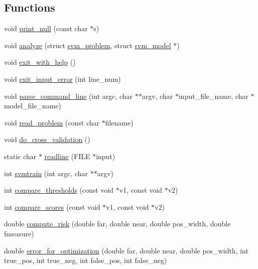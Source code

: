 \subsection*{Functions}
\begin{DoxyCompactItemize}
\item 
void \hyperlink{_2svm-train_8cpp_a65c4fd49dffe24dd51ad9505c5c1ff4a}{print\-\_\-null} (const char $\ast$s)
\item 
void \hyperlink{_2svm-train_8cpp_a6f420eac4f979422d475754e1ee41a0f}{analyze} (struct \hyperlink{structsvm__problem}{svm\-\_\-problem}, struct \hyperlink{structsvm__model}{svm\-\_\-model} $\ast$)
\item 
void \hyperlink{_2svm-train_8cpp_a8bbbfc2cd5ea26b69d3b880c6f509e93}{exit\-\_\-with\-\_\-help} ()
\item 
void \hyperlink{_2svm-train_8cpp_ada0be431a4ed2ba4b1a09d4449f2c75b}{exit\-\_\-input\-\_\-error} (int line\-\_\-num)
\item 
void \hyperlink{_2svm-train_8cpp_a15f26fdd66eabc2d70d032433a9c8a50}{parse\-\_\-command\-\_\-line} (int argc, char $\ast$$\ast$argv, char $\ast$input\-\_\-file\-\_\-name, char $\ast$model\-\_\-file\-\_\-name)
\item 
void \hyperlink{_2svm-train_8cpp_a867369fb2d5148f5da088f4279a2ae8b}{read\-\_\-problem} (const char $\ast$filename)
\item 
void \hyperlink{_2svm-train_8cpp_a997126c915d77402d81a828226383928}{do\-\_\-cross\-\_\-validation} ()
\item 
static char $\ast$ \hyperlink{_2svm-train_8cpp_aa324656b7bb4eb3ee42699d33c21ef7a}{readline} (F\-I\-L\-E $\ast$input)
\item 
int \hyperlink{_2svm-train_8cpp_ae76c8c1fe85a0e20a93cf587b71f9ea9}{svmtrain} (int argc, char $\ast$$\ast$argv)
\item 
int \hyperlink{_2svm-train_8cpp_aa4983a5b9ebd114f13a80eb2f68f2bb7}{compare\-\_\-thresholds} (const void $\ast$v1, const void $\ast$v2)
\item 
int \hyperlink{_2svm-train_8cpp_ab7647dadbd83ef2020afa080091c43bd}{compare\-\_\-scores} (const void $\ast$v1, const void $\ast$v2)
\item 
double \hyperlink{_2svm-train_8cpp_af07f0fa4ba41934e435cb8f3b955ea8d}{compute\-\_\-risk} (double far, double near, double pos\-\_\-width, double fmeasure)
\item 
double \hyperlink{_2svm-train_8cpp_a9fccbe7b58f4809ef8085cac3d8ac32c}{error\-\_\-for\-\_\-optimization} (double far, double near, double pos\-\_\-width, int true\-\_\-pos, int true\-\_\-neg, int false\-\_\-pos, int false\-\_\-neg)
\end{DoxyCompactItemize}
